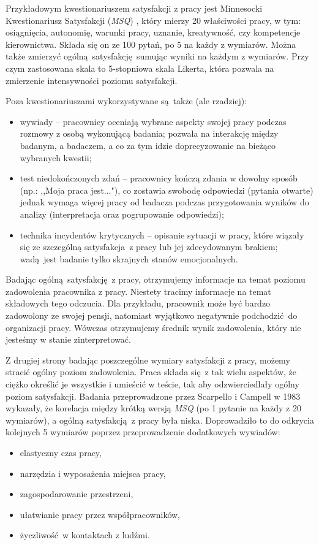Przykładowym kwestionariuszem satysfakcji z pracy jest Minnesocki Kwestionariusz Satysfakcji (\emph{MSQ}) \citep{weiss1967manual}, który mierzy 20 właściwości pracy, w tym: osiągnięcia, autonomię, warunki pracy, uznanie, kreatywność, czy kompetencje kierownictwa. Składa się on ze 100 pytań, po 5 na każdy z wymiarów. Można także zmierzyć
ogólną satysfakcję sumując wyniki na każdym z wymiarów. Przy czym zastosowana skala to 5-stopniowa skala Likerta, która pozwala na zmierzenie intensywności poziomu satysfakcji.

Poza kwestionariuszami wykorzystywane są także (ale rzadziej):
\begin{itemize}
\item wywiady -- pracownicy oceniają wybrane aspekty swojej pracy podczas rozmowy z osobą wykonującą badania; pozwala na interakcję między badanym, a badaczem, a co za tym idzie doprecyzowanie na bieżąco wybranych kwestii;
\item test niedokończonych zdań -- pracownicy kończą zdania w dowolny sposób (np.: ,,Moja praca jest..."), co zostawia swobodę odpowiedzi (pytania otwarte) jednak wymaga więcej pracy od badacza podczas przygotowania wyników do analizy (interpretacja oraz pogrupowanie odpowiedzi);
\item technika incydentów krytycznych -- opisanie sytuacji w pracy, które wiązały się ze szczególną satysfakcja z pracy lub jej zdecydowanym brakiem; wadą jest badanie tylko skrajnych stanów emocjonalnych.
\end{itemize}

Badając ogólną satysfakcję z pracy, otrzymujemy informacje na temat poziomu zadowolenia pracownika z pracy. Niestety tracimy informacje na temat składowych tego odczucia. Dla przykładu, pracownik może być bardzo zadowolony ze swojej pensji, natomiast wyjątkowo negatywnie podchodzić do organizacji pracy. Wówczas otrzymujemy średnik wynik zadowolenia, który nie jesteśmy w stanie zinterpretować.

Z drugiej strony badając poszczególne wymiary satysfakcji z pracy, możemy stracić ogólny poziom zadowolenia. Praca składa się z tak wielu aspektów, że ciężko określić je wszystkie i umieścić w teście, tak aby odzwierciedlały ogólny poziom satysfakcji. Badania przeprowadzone przez Scarpello i Campell w 1983 \citep{scarpello1983job} wykazały, że korelacja między krótką wersją \emph{MSQ} (po 1 pytanie na każdy z 20 wymiarów), a ogólną satysfakcją z pracy była niska. Doprowadziło to do odkrycia
kolejnych 
5 wymiarów poprzez przeprowadzenie dodatkowych wywiadów:
\begin{itemize}
\item elastyczny czas pracy,
\item narzędzia i wyposażenia miejsca pracy,
\item zagospodarowanie przestrzeni,
\item ułatwianie pracy przez współpracowników,
\item życzliwość w kontaktach z ludźmi.
\end{itemize}
